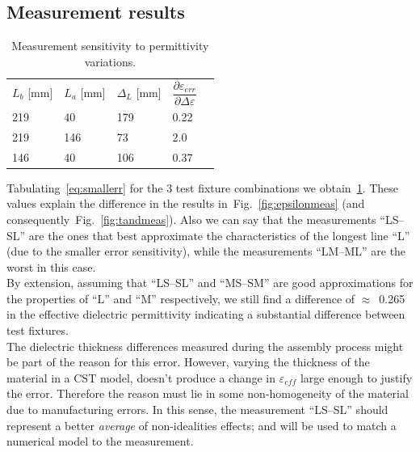 \documentclass[11pt,a4paper]{article}
\newcommand{\fig}[1]{Fig.~\ref{#1}}
\newcommand{\laser}[1]{``#1''}
\begin{document}
    \subsection{Measurement results}
    \label{subsec:measure-error}
    \begin{table}[!ht]
        \centering
        \begin{tabular}{|l|l|l|l|l}
            \cline{1-4}
            $L_b$ {[}mm{]} & $L_a$ {[}mm{]} & $\Delta_L$ {[}mm{]} & $\dfrac{\partial \varepsilon_{err}}{\partial \Delta\varepsilon}$  \rule[-4mm]{0mm}{11mm}&  \\ \cline{1-4}
            219            & 40             & 179                 & 0.22                                                                                   & \\ \cline{1-4}
            219            & 146            & 73                  & 2.0                                                                                    & \\ \cline{1-4}
            146            & 40             & 106                 & 0.37                                                                                   & \\ \cline{1-4}
        \end{tabular}
        \caption{Measurement sensitivity to permittivity variations.}
        \label{tab:errorsensitivity}
    \end{table}
    Tabulating~\eqref{eq:smallerr} for the 3 test fixture combinations we obtain~\ref{tab:errorsensitivity}.
    These values explain the difference in the results in~\fig{fig:epsilonmeas} (and consequently~\fig{fig:tandmeas}).
    Also we can say that the measurements \laser{LS--SL} are the ones that best approximate the characteristics of the
    longest line \laser{L} (due to the smaller error sensitivity), while the measurements \laser{LM--ML} are the worst
    in this case.\\
    By extension, assuming that \laser{LS--SL} and \laser{MS--SM} are good approximations for the properties of
    \laser{L} and \laser{M} respectively, we still find a difference of $\approx$~0.265 in the effective dielectric
    permittivity indicating a substantial difference between test fixtures.\\
    The dielectric thickness differences measured during the assembly process might be part of the reason for this error.
    However, varying the thickness of the material in a CST model, doesn't produce a change in $\varepsilon_{eff}$
    large enough to justify the error.
    Therefore the reason must lie in some non-homogeneity of the material due to manufacturing errors.
    In this sense, the measurement \laser{LS--SL} should represent a better \emph{average} of non-idealities effects;
    and will be used to match a numerical model to the measurement.
\end{document}
